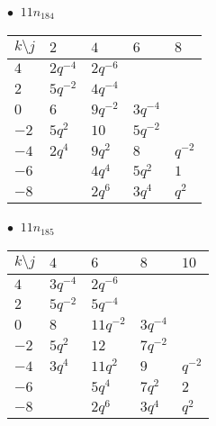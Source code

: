 \begin{minipage}{\linewidth}
$\bullet\ $ $11n_{184}$ \vspace{0.5em} \\
\begin{tabular}{l|llll}
$k \setminus j$ & $2$ & $4$ & $6$ & $8$ \\
\hline
$4$ & $2q^{-4}$ & $2q^{-6}$ &  &  \\
$2$ & $5q^{-2}$ & $4q^{-4}$ &  &  \\
$0$ & $6$ & $9q^{-2}$ & $3q^{-4}$ &  \\
$-2$ & $5q^{2}$ & $10$ & $5q^{-2}$ &  \\
$-4$ & $2q^{4}$ & $9q^{2}$ & $8$ & $q^{-2}$ \\
$-6$ &  & $4q^{4}$ & $5q^{2}$ & $1$ \\
$-8$ &  & $2q^{6}$ & $3q^{4}$ & $q^{2}$ \\
\end{tabular}
\vspace{2em}
\end{minipage}
%
\begin{minipage}{\linewidth}
$\bullet\ $ $11n_{185}$ \vspace{0.5em} \\
\begin{tabular}{l|llll}
$k \setminus j$ & $4$ & $6$ & $8$ & $10$ \\
\hline
$4$ & $3q^{-4}$ & $2q^{-6}$ &  &  \\
$2$ & $5q^{-2}$ & $5q^{-4}$ &  &  \\
$0$ & $8$ & $11q^{-2}$ & $3q^{-4}$ &  \\
$-2$ & $5q^{2}$ & $12$ & $7q^{-2}$ &  \\
$-4$ & $3q^{4}$ & $11q^{2}$ & $9$ & $q^{-2}$ \\
$-6$ &  & $5q^{4}$ & $7q^{2}$ & $2$ \\
$-8$ &  & $2q^{6}$ & $3q^{4}$ & $q^{2}$ \\
\end{tabular}
\vspace{2em}
\end{minipage}